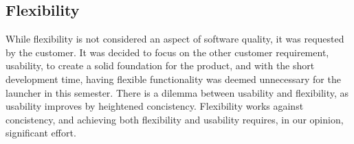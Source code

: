 \subsection{Flexibility}
While flexibility is not considered an aspect of software quality, it was requested by the customer. 
It was decided to focus on the other customer requirement, usability, to create a solid foundation for the product, and with the short development time, having flexible functionality was deemed unnecessary for the launcher in this semester. 
There is a dilemma between usability and flexibility, as usability improves by heightened concistency.
Flexibility works against concistency, and achieving both flexibility and usability requires, in our opinion, significant effort.